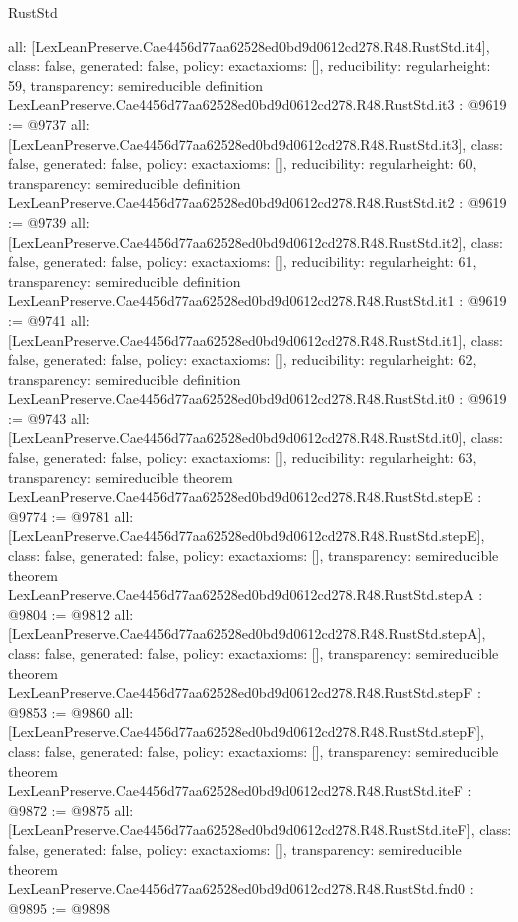 \begin{lexlean}{RustStd}
\begin{coremodule}
{  all: [LexLeanPreserve.Cae4456d77aa62528ed0bd9d0612cd278.R48.RustStd.it4],
  class: false,
  generated: false,
  policy: exact{axioms: []},
  reducibility: regular{height: 59},
  transparency: semireducible
}
definition LexLeanPreserve.Cae4456d77aa62528ed0bd9d0612cd278.R48.RustStd.it3 : @9619 := @9737 {
  all: [LexLeanPreserve.Cae4456d77aa62528ed0bd9d0612cd278.R48.RustStd.it3],
  class: false,
  generated: false,
  policy: exact{axioms: []},
  reducibility: regular{height: 60},
  transparency: semireducible
}
definition LexLeanPreserve.Cae4456d77aa62528ed0bd9d0612cd278.R48.RustStd.it2 : @9619 := @9739 {
  all: [LexLeanPreserve.Cae4456d77aa62528ed0bd9d0612cd278.R48.RustStd.it2],
  class: false,
  generated: false,
  policy: exact{axioms: []},
  reducibility: regular{height: 61},
  transparency: semireducible
}
definition LexLeanPreserve.Cae4456d77aa62528ed0bd9d0612cd278.R48.RustStd.it1 : @9619 := @9741 {
  all: [LexLeanPreserve.Cae4456d77aa62528ed0bd9d0612cd278.R48.RustStd.it1],
  class: false,
  generated: false,
  policy: exact{axioms: []},
  reducibility: regular{height: 62},
  transparency: semireducible
}
definition LexLeanPreserve.Cae4456d77aa62528ed0bd9d0612cd278.R48.RustStd.it0 : @9619 := @9743 {
  all: [LexLeanPreserve.Cae4456d77aa62528ed0bd9d0612cd278.R48.RustStd.it0],
  class: false,
  generated: false,
  policy: exact{axioms: []},
  reducibility: regular{height: 63},
  transparency: semireducible
}
theorem LexLeanPreserve.Cae4456d77aa62528ed0bd9d0612cd278.R48.RustStd.stepE : @9774 := @9781 {
  all: [LexLeanPreserve.Cae4456d77aa62528ed0bd9d0612cd278.R48.RustStd.stepE],
  class: false,
  generated: false,
  policy: exact{axioms: []},
  transparency: semireducible
}
theorem LexLeanPreserve.Cae4456d77aa62528ed0bd9d0612cd278.R48.RustStd.stepA : @9804 := @9812 {
  all: [LexLeanPreserve.Cae4456d77aa62528ed0bd9d0612cd278.R48.RustStd.stepA],
  class: false,
  generated: false,
  policy: exact{axioms: []},
  transparency: semireducible
}
theorem LexLeanPreserve.Cae4456d77aa62528ed0bd9d0612cd278.R48.RustStd.stepF : @9853 := @9860 {
  all: [LexLeanPreserve.Cae4456d77aa62528ed0bd9d0612cd278.R48.RustStd.stepF],
  class: false,
  generated: false,
  policy: exact{axioms: []},
  transparency: semireducible
}
theorem LexLeanPreserve.Cae4456d77aa62528ed0bd9d0612cd278.R48.RustStd.iteF : @9872 := @9875 {
  all: [LexLeanPreserve.Cae4456d77aa62528ed0bd9d0612cd278.R48.RustStd.iteF],
  class: false,
  generated: false,
  policy: exact{axioms: []},
  transparency: semireducible
}
theorem LexLeanPreserve.Cae4456d77aa62528ed0bd9d0612cd278.R48.RustStd.fnd0 : @9895 := @9898 {
}
\end{coremodule}
\end{lexlean}
